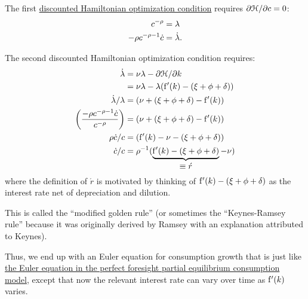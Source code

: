 \documentclass{handout}
\begin{document}
The first \href{https://en.wikipedia.org/wiki/Hamiltonian_(control_theory)}{discounted Hamiltonian optimization condition} requires $\partial 
\mathcal{H}/\partial c = 0$:
\begin{equation}\begin{gathered}\begin{aligned}
  c^{-\rho} & =  \lambda  \label{eq:H1A} \\
  -\rho c^{-\rho-1}\dot{c} & =  \dot{\lambda} 
                                       .
\end{aligned}\end{gathered}\end{equation}

The second discounted Hamiltonian optimization condition requires:
\begin{equation}\begin{gathered}\begin{aligned}
  \dot{\lambda} & =  \nu\lambda - \partial \mathcal{H}/\partial {k}  \\
                & =  \nu\lambda - \lambda (\mathrm{f}^{\prime}({k}) - (\xi+\phi+\delta))  \\
  \dot{\lambda}/{\lambda} & =  (\nu+(\xi+\phi+\delta)-\mathrm{f}^{\prime}({k}))
  \\  \left(\frac{-\rho c^{-\rho-1}\dot{c}}{c^{-\rho}}\right) & =  (\nu+(\xi+\phi+\delta)-\mathrm{f}^{\prime}({k}))
  \\  \rho \dot{c}/c & =  (\mathrm{f}^{\prime}({k})-\nu-(\xi+\phi+\delta))
  \\  \dot{c}/c  & =  \rho^{-1}(\underbrace{\mathrm{f}^{\prime}({k})-(\xi+\phi+\delta)}_{\mbox{$\equiv \acute{r}$}}-\nu)
\end{aligned}\end{gathered}\end{equation}
where the definition of $\acute{r}$ is motivated by thinking of 
$\mathrm{f}^{\prime}({k})-(\xi+\phi+\delta)$ as the interest rate net of depreciation and
dilution.  

This is called the ``modified golden rule'' (or sometimes the 
``Keynes-Ramsey rule'' because it was originally derived by 
Ramsey with an explanation attributed to Keynes).  

Thus, we end up with an Euler equation for consumption growth that is
just like \href{https://www.econ2.jhu.edu/people/ccarroll/public/LectureNotes/Consumption/PerfForesightCRRA/#EulerCGroFac}{the Euler equation in the perfect foresight partial equilibrium consumption model}, except that now the relevant interest rate can vary over
time as $\mathrm{f}^{\prime}({k})$ varies.
\end{document}

